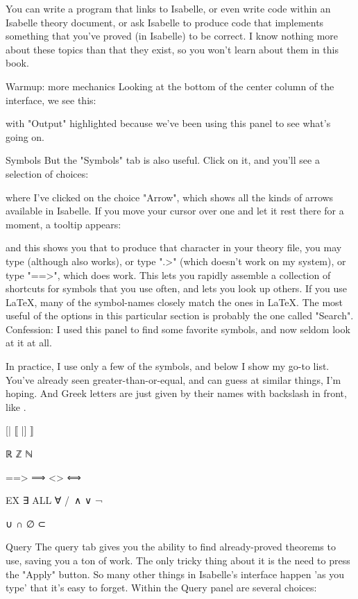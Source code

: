 You can write a program that links to Isabelle, or even write code within an Isabelle theory document, or ask Isabelle to produce code that implements something that you've proved (in Isabelle) to be correct. I know nothing more about these topics than that they exist, so you won't learn about them in this book. 

Warmup: more mechanics
Looking at the bottom of the center column of the interface, we see this:



with "Output" highlighted because we've been using this panel to see what's going on. 

Symbols
But the "Symbols" tab is also useful. Click on it, and you'll see a selection of choices:

where I've clicked on the choice "Arrow", which shows all the kinds of arrows available in Isabelle. If you move your cursor over one and let it rest there for a moment, a tooltip appears:


and this shows you that to produce that character in your theory file, you may type  (although \isi{\\Longrightarrow} also works), or type ".>" (which doesn't work on my system), or type "==>", which does work. This lets you rapidly assemble a collection of shortcuts for symbols that you use often, and lets you look up others. If you use LaTeX, many of the symbol-names closely match the ones in LaTeX. The most useful of the options in this particular section is probably the one called "Search". Confession: I used this panel to find some favorite symbols, and now seldom look at it at all. 

In practice, I use only a few of the symbols, and below I show my go-to list. You've already seen greater-than-or-equal, and can guess at similar things, I'm hoping. And Greek letters are just given by their names with backslash in front, like \beta.

  [|    ⟦
  |]    ⟧

  \real ℝ
  \int  ℤ
  \nat  ℕ

  ==>  ⟹  
  <>   ⟺

  EX    ∃
  ALL   ∀
  /\    ∧
  \/    ∨
  \not  ¬

  \union ∪
  \inter ∩
  \emptyset ∅
  \subset ⊂

Query
The query tab gives you the ability to find already-proved theorems to use, saving you a ton of work. The only tricky thing about it is the need to press the "Apply" button. So many other things in Isabelle's interface happen 'as you type' that it's easy to forget. Within the Query panel are several choices:


